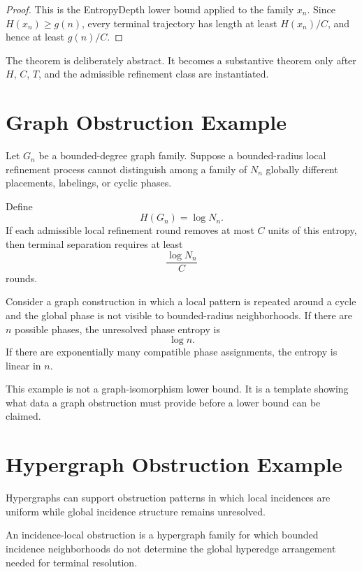 \begin{proof}
This is the EntropyDepth lower bound applied to the family \(x_n\). Since
\(H(x_n)\ge g(n)\), every terminal trajectory has length at least
\(H(x_n)/C\), and hence at least \(g(n)/C\).
\end{proof}

The theorem is deliberately abstract. It becomes a substantive theorem only
after \(H\), \(C\), \(T\), and the admissible refinement class are instantiated.

\section{Graph Obstruction Example}

Let \(G_n\) be a bounded-degree graph family. Suppose a bounded-radius local
refinement process cannot distinguish among a family of \(N_n\) globally
different placements, labelings, or cyclic phases.

Define
\[
H(G_n)=\log N_n.
\]
If each admissible local refinement round removes at most \(C\) units of this
entropy, then terminal separation requires at least
\[
\frac{\log N_n}{C}
\]
rounds.

\begin{example}
Consider a graph construction in which a local pattern is repeated around a
cycle and the global phase is not visible to bounded-radius neighborhoods.
If there are \(n\) possible phases, the unresolved phase entropy is
\[
\log n.
\]
If there are exponentially many compatible phase assignments, the entropy is
linear in \(n\).
\end{example}

This example is not a graph-isomorphism lower bound. It is a template showing
what data a graph obstruction must provide before a lower bound can be claimed.

\section{Hypergraph Obstruction Example}

Hypergraphs can support obstruction patterns in which local incidences are
uniform while global incidence structure remains unresolved.

\begin{definition}
An incidence-local obstruction is a hypergraph family for which bounded
incidence neighborhoods do not determine the global hyperedge arrangement
needed for terminal resolution.
\end{definition}

